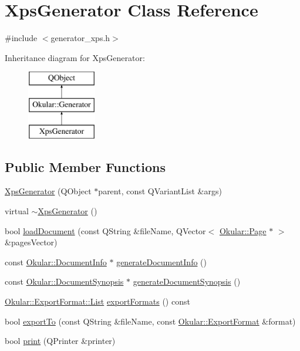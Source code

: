 \hypertarget{classXpsGenerator}{\section{Xps\+Generator Class Reference}
\label{classXpsGenerator}
}


{\ttfamily \#include $<$generator\+\_\+xps.\+h$>$}

Inheritance diagram for Xps\+Generator\+:\begin{figure}[H]
\begin{center}
\leavevmode
\includegraphics[height=3.000000cm]{classXpsGenerator}
\end{center}
\end{figure}
\subsection*{Public Member Functions}
\begin{DoxyCompactItemize}
\item 
\hyperlink{classXpsGenerator_ab45ffa203e0ff8e914ac791957f0bdb9}{Xps\+Generator} (Q\+Object $\ast$parent, const Q\+Variant\+List \&args)
\item 
virtual \hyperlink{classXpsGenerator_ad746dff01a04fd2c466492dfa4fd6c61}{$\sim$\+Xps\+Generator} ()
\item 
bool \hyperlink{classXpsGenerator_ad9dbb7751c648e4d84375c660f4413f7}{load\+Document} (const Q\+String \&file\+Name, Q\+Vector$<$ \hyperlink{classOkular_1_1Page}{Okular\+::\+Page} $\ast$ $>$ \&pages\+Vector)
\item 
const \hyperlink{classOkular_1_1DocumentInfo}{Okular\+::\+Document\+Info} $\ast$ \hyperlink{classXpsGenerator_aecd272f63ce43adfd2c0d783ce35e86c}{generate\+Document\+Info} ()
\item 
const \hyperlink{classOkular_1_1DocumentSynopsis}{Okular\+::\+Document\+Synopsis} $\ast$ \hyperlink{classXpsGenerator_af8160269135201b5316f55e65de453d0}{generate\+Document\+Synopsis} ()
\item 
\hyperlink{classOkular_1_1ExportFormat_a987d72c1a1456b8a983a37603a8fa78d}{Okular\+::\+Export\+Format\+::\+List} \hyperlink{classXpsGenerator_a905233aeb58d84755c023560de983f60}{export\+Formats} () const 
\item 
bool \hyperlink{classXpsGenerator_ad2c54714034488fbb43aa40c628ba23a}{export\+To} (const Q\+String \&file\+Name, const \hyperlink{classOkular_1_1ExportFormat}{Okular\+::\+Export\+Format} \&format)
\item 
bool \hyperlink{classXpsGenerator_a2d728c7712162ffa3a2cb0f66f82c825}{print} (Q\+Printer \&printer)
\end{DoxyCompactItemize}
